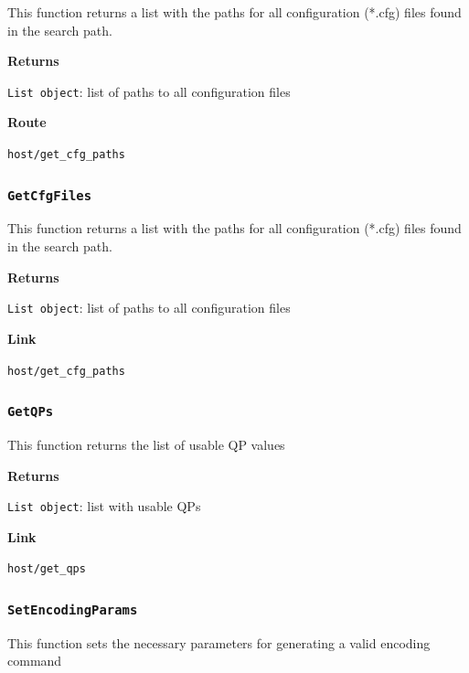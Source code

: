 \documentclass{article}
\begin{document}
This function returns a list with the paths for all configuration (*.cfg) files found in the search path.

\textbf{Returns}

\texttt{List object}: list of paths to all configuration files

\textbf{Route}

\texttt{host/get_cfg_paths}


\subsubsection*{\texttt{GetCfgFiles}}

This function returns a list with the paths for all configuration (*.cfg) files found in the search path.

\textbf{Returns}

\texttt{List object}: list of paths to all configuration files

\textbf{Link}

\texttt{host/get_cfg_paths}


\subsubsection*{\texttt{GetQPs}}

This function returns the list of usable QP values

\textbf{Returns}

\texttt{List object}: list with usable QPs

\textbf{Link}

\texttt{host/get_qps}


\subsubsection*{\texttt{SetEncodingParams}}

This function sets the necessary parameters for generating a valid encoding command
\end{document}
